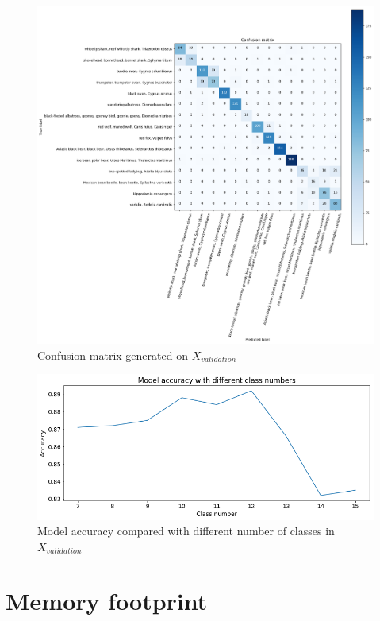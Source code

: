\documentclass[times, utf8, diplomski]{fer}
\begin{document}
\begin{figure}
  \includegraphics[scale=0.47]{figures/confusion_matrix.png}
  \centering
  \caption{Confusion matrix generated on $X_{validation}$}
  \label{fig:species_confusion_matrix}
\end{figure}

\begin{figure}
  \includegraphics[scale=0.59]{figures/model_acc_class_num.png}
  \centering
  \caption{Model accuracy compared with different number of classes in $X_{validation}$}
  \label{fig:model_acc_class_num}
\end{figure}


\section{Memory footprint}
\end{document}
